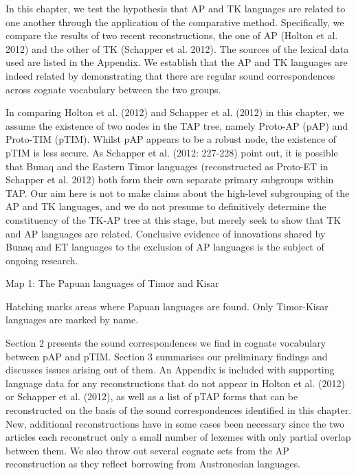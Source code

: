 In this chapter, we test the hypothesis that AP and TK languages are related to one another through the application of the comparative method. Specifically, we compare the results of two recent reconstructions, the one of AP (Holton et al. 2012) and the other of TK (Schapper et al. 2012). The sources of the lexical data used are listed in the Appendix. We establish that the AP and TK languages are indeed related by demonstrating that there are regular sound correspondences across cognate vocabulary between the two groups. 

In comparing Holton et al. (2012) and Schapper et al. (2012) in this chapter, we assume the existence of two nodes in the TAP tree, namely Proto-AP (pAP) and Proto-TIM (pTIM). Whilst pAP appears to be a robust node, the existence of pTIM is less secure. As Schapper et al. (2012: 227-228) point out, it is possible that Bunaq and the Eastern Timor languages (reconstructed as Proto-ET in Schapper et al. 2012) both form their own separate primary subgroups within TAP. Our aim here is not to make claims about the high-level subgrouping of the AP and TK languages, and we do not presume to definitively determine the constituency of the TK-AP tree at this stage, but merely seek to show that TK and AP languages are related. Conclusive evidence of innovations shared by Bunaq and ET languages to the exclusion of AP languages is the subject of ongoing research. 

{\centering
Map 1: The Papuan languages of Timor and Kisar {\dag}
\par}

{\dag} Hatching marks areas where Papuan languages are found. Only Timor-Kisar languages are marked by name.

Section 2 presents the sound correspondences we find in cognate vocabulary between pAP and pTIM. Section 3 summarises our preliminary findings and discusses issues arising out of them. An Appendix is included with supporting language data for any reconstructions that do not appear in Holton et al. (2012) or Schapper et al. (2012), as well as a list of pTAP forms that can be reconstructed on the basis of the sound correspondences identified in this chapter. New, additional reconstructions have in some cases been necessary since the two articles each reconstruct only a small number of lexemes with only partial overlap between them. We also throw out several cognate sets from the AP reconstruction as they reflect borrowing from Austronesian languages. 

